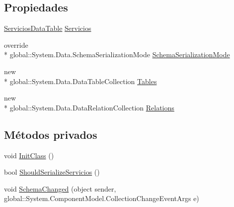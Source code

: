 \subsection*{Propiedades}
\begin{DoxyCompactItemize}
\item 
\hyperlink{class_proyecto___integrador__3_1_1ds_servicios_1_1_servicios_data_table}{Servicios\-Data\-Table} \hyperlink{class_proyecto___integrador__3_1_1ds_servicios_a03c1b1284ccc9c2b139d6102da34f6e9}{Servicios}
\item 
override \\*
global\-::\-System.\-Data.\-Schema\-Serialization\-Mode \hyperlink{class_proyecto___integrador__3_1_1ds_servicios_a062b8dfa3dfcc4aa92a8bf2d69194589}{Schema\-Serialization\-Mode}
\item 
new \\*
global\-::\-System.\-Data.\-Data\-Table\-Collection \hyperlink{class_proyecto___integrador__3_1_1ds_servicios_a2b08d569f4f435957a1f10b46c304cb2}{Tables}
\item 
new \\*
global\-::\-System.\-Data.\-Data\-Relation\-Collection \hyperlink{class_proyecto___integrador__3_1_1ds_servicios_a4a938f593d4405efc7c790a3b3a5b9d7}{Relations}
\end{DoxyCompactItemize}
\subsection*{Métodos privados}
\begin{DoxyCompactItemize}
\item 
void \hyperlink{class_proyecto___integrador__3_1_1ds_servicios_a8c235d04c7e4dac9966f771f9517e5bf}{Init\-Class} ()
\item 
bool \hyperlink{class_proyecto___integrador__3_1_1ds_servicios_a207b5614ad2666dd9212ee57fd3338e2}{Should\-Serialize\-Servicios} ()
\item 
void \hyperlink{class_proyecto___integrador__3_1_1ds_servicios_ac0aff57addf6d1f24077d11c3abe845e}{Schema\-Changed} (object sender, global\-::\-System.\-Component\-Model.\-Collection\-Change\-Event\-Args e)
\end{DoxyCompactItemize}
